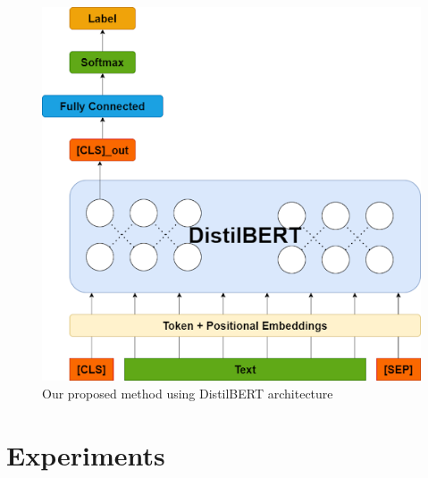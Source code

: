 \documentclass[sn-mathphys,Numbered]{sn-jnl}%
\theoremstyle{thmstyleone}%
\theoremstyle{thmstyletwo}%
\theoremstyle{thmstylethree}%
\begin{document}
\begin{figure}[htp]
\centering
\includegraphics[scale=.4]{distilbert.png}
\caption{Our proposed method using DistilBERT architecture}
\label{fig:distilbert}
\end{figure}

\section{Experiments}\label{experiments}
\end{document}
